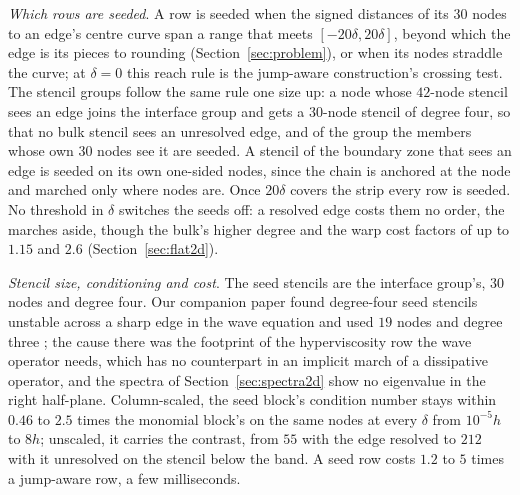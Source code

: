\documentclass[11pt]{amsart}
\theoremstyle{definition}
\theoremstyle{remark}
\newcommand{\para}[1]{\par\smallskip\noindent\textit{#1}.\enspace}
\begin{document}
\para{Which rows are seeded}
A row is seeded when the signed distances of its $30$ nodes to an edge's
centre curve span a range that meets $[-20\delta, 20\delta]$, beyond which
the edge is its pieces to rounding (Section~\ref{sec:problem}), or when
its nodes straddle the curve; at $\delta = 0$ this reach rule is the
jump-aware construction's crossing test. The stencil groups follow the same
rule one
size up: a node whose $42$-node stencil sees an edge joins the interface
group and gets a $30$-node stencil of degree four, so that no bulk stencil
sees an unresolved edge, and of the group the members whose own $30$ nodes
see it are seeded. A stencil of the boundary zone that sees an edge is
seeded on its own one-sided nodes, since the chain is anchored at the node
and marched only where nodes are. Once $20\delta$ covers the strip every
row is seeded. No threshold in $\delta$ switches the seeds off: a resolved
edge costs them no order, the marches aside, though the bulk's higher degree
and the warp cost factors of up to $1.15$ and $2.6$ (Section~\ref{sec:flat2d}).

\para{Stencil size, conditioning and cost}
The seed stencils are the interface group's, $30$ nodes and degree four.
Our companion paper found degree-four seed stencils unstable across a sharp
edge in the wave equation and used $19$ nodes and degree three
\cite{Martin2026seeds}; the cause there was the footprint of the
hyperviscosity row the wave operator needs, which has no counterpart in an
implicit march of a dissipative operator, and the spectra of
Section~\ref{sec:spectra2d} show no eigenvalue in the right half-plane.
Column-scaled, the seed block's condition number stays within $0.46$ to
$2.5$ times the monomial block's on the same nodes at every $\delta$ from
$10^{-5} h$ to $8h$; unscaled, it carries the contrast, from $55$ with the
edge resolved to $212$ with it unresolved on the stencil below the band. A
seed row costs $1.2$ to $5$ times a jump-aware row, a few milliseconds.
\end{document}
